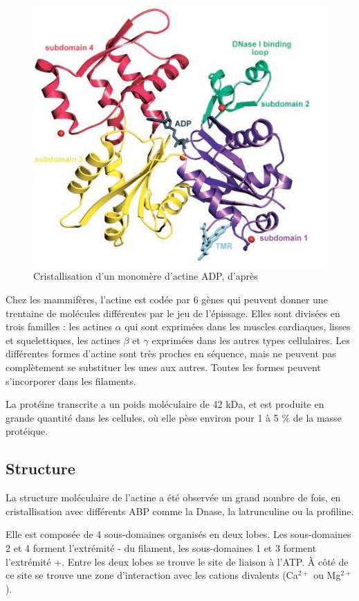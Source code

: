 \begin{figure}
\includegraphics[scale=0.7]{Actine_dominguez.png}
\caption{Cristallisation d'un monomère d'actine ADP, d'après \cite{otterbein_crystal_2001}}
\end{figure}

Chez les mammifères, l'actine est codée par 6 gènes qui peuvent donner une trentaine de molécules différentes par le jeu de l'épissage. 
Elles sont divisées en trois familles : les actines $\alpha$ qui sont exprimées dans les muscles cardiaques, lisses et squelettiques, les actines $\beta$ et $\gamma$ exprimées dans les autres types cellulaires.
Les différentes formes d'actine sont très proches en séquence, mais ne peuvent pas complètement se substituer les unes aux autres. Toutes les formes peuvent s'incorporer dans les filaments. 

La protéine transcrite a un poids moléculaire de 42 kDa, et est produite en grande quantité dans les cellules, où elle pèse environ pour 1 à 5 \% de la masse protéique. 

\subsection{Structure}
La structure moléculaire de l'actine a été observée un grand nombre de fois, en cristallisation avec différents ABP comme la Dnase, la latrunculine ou la profiline. 


Elle est composée de 4 sous-domaines organisés en deux lobes. Les sous-domaines 2 et 4 forment l'extrémité - du filament, les sous-domaines 1 et 3 forment l'extrémité +. Entre les deux lobes se trouve le site de liaison à l'ATP. 
À côté de ce site se trouve une zone d'interaction avec les cations divalents (Ca$^{2+}$ ou Mg$^{2+}$). 

